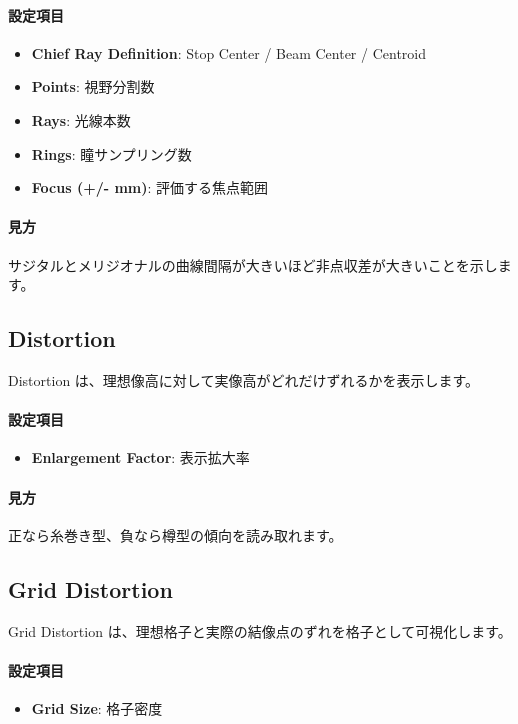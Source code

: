 \documentclass[11pt]{article}
\begin{document}
\paragraph{設定項目}
\begin{itemize}
  \item \textbf{Chief Ray Definition}: Stop Center / Beam Center / Centroid
  \item \textbf{Points}: 視野分割数
  \item \textbf{Rays}: 光線本数
  \item \textbf{Rings}: 瞳サンプリング数
  \item \textbf{Focus (+/- mm)}: 評価する焦点範囲
\end{itemize}

\paragraph{見方}
サジタルとメリジオナルの曲線間隔が大きいほど非点収差が大きいことを示します。

\subsection{Distortion}
Distortion は、理想像高に対して実像高がどれだけずれるかを表示します。

\paragraph{設定項目}
\begin{itemize}
  \item \textbf{Enlargement Factor}: 表示拡大率
\end{itemize}

\paragraph{見方}
正なら糸巻き型、負なら樽型の傾向を読み取れます。

\subsection{Grid Distortion}
Grid Distortion は、理想格子と実際の結像点のずれを格子として可視化します。

\paragraph{設定項目}
\begin{itemize}
  \item \textbf{Grid Size}: 格子密度
\end{itemize}
\end{document}
